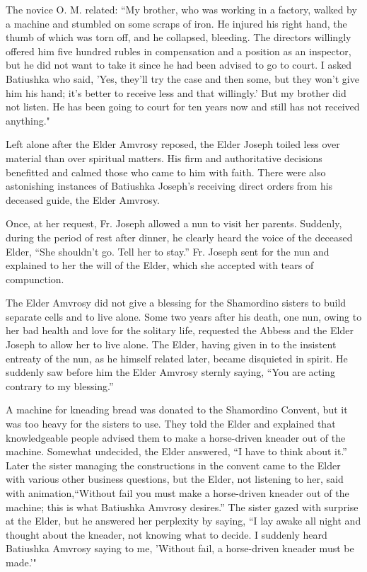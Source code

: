 The novice O. M. related: “My brother, who was working in a factory, walked by a machine and stumbled on some scraps of iron. He injured his right hand, the thumb of which was torn off, and he collapsed, bleeding. The directors willingly offered him five hundred rubles in compensation and a position as an inspector, but he did not want to take it since he had been advised to go to court. I asked Batiushka who said, 'Yes, they'll try the case and then some, but they won't give him his hand; it's better to receive less and that willingly.' But my brother did not listen. He has been going to court for ten years now and still has not received anything."

Left alone after the Elder Amvrosy reposed, the Elder Joseph toiled less over material than over spiritual matters. His firm and authoritative decisions benefitted and calmed those who came to him with faith. There were also astonishing instances of Batiushka Joseph's receiving direct orders from his deceased guide, the Elder Amvrosy.

Once, at her request, Fr. Joseph allowed a nun to visit her parents. Suddenly, during the period of rest after dinner, he clearly heard the voice of the deceased Elder, “She shouldn't go. Tell her to stay.” Fr. Joseph sent for the nun and explained to her the will of the Elder, which she accepted with tears of compunction.

The Elder Amvrosy did not give a blessing for the Shamordino sisters to build separate cells and to live alone. Some two years after his death, one nun, owing to her bad health and love for the solitary life, requested the Abbess and the Elder Joseph to allow her to live alone. The Elder, having given in to the insistent entreaty of the nun, as he himself related later, became disquieted in spirit. He suddenly saw before him the Elder Amvrosy sternly saying, “You are acting contrary to my blessing.”

A machine for kneading bread was donated to the Shamordino Convent, but it was too heavy for the sisters to use. They told the Elder and explained that knowledgeable people advised them to make a horse-driven kneader out of the machine. Somewhat undecided, the Elder answered, “I have to think about it.” Later the sister managing the constructions in the convent came to the Elder with various other business questions, but the Elder, not listening to her, said with animation,“Without fail you must make a horse-driven kneader out of the machine; this is what Batiushka Amvrosy desires.” The sister gazed with surprise at the Elder, but he answered her perplexity by saying, “I lay awake all night and thought about the kneader, not knowing what to decide. I suddenly heard Batiushka Amvrosy saying to me, 'Without fail, a horse-driven kneader must be made.'"


